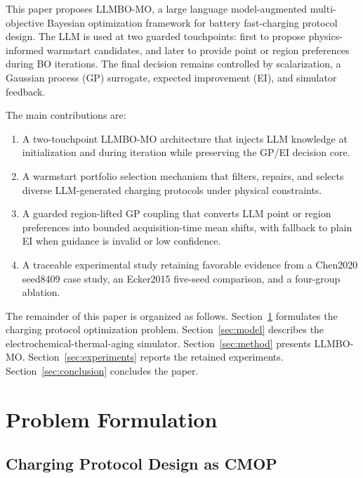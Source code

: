 \documentclass[journal]{IEEEtran}
\begin{document}
This paper proposes LLMBO-MO, a large language model-augmented multi-objective
Bayesian optimization framework for battery fast-charging protocol design. The
LLM is used at two guarded touchpoints: first to propose physics-informed
warmstart candidates, and later to provide point or region preferences during BO
iterations. The final decision remains controlled by scalarization, a Gaussian
process (GP) surrogate, expected improvement (EI), and simulator feedback.

The main contributions are:
\begin{enumerate}
\item A two-touchpoint LLMBO-MO architecture that injects LLM knowledge at
initialization and during iteration while preserving the GP/EI decision core.
\item A warmstart portfolio selection mechanism that filters, repairs, and
selects diverse LLM-generated charging protocols under physical constraints.
\item A guarded region-lifted GP coupling that converts LLM point or region
preferences into bounded acquisition-time mean shifts, with fallback to plain EI
when guidance is invalid or low confidence.
\item A traceable experimental study retaining favorable evidence from a
Chen2020 seed8409 case study, an Ecker2015 five-seed comparison, and a
four-group ablation.
\end{enumerate}

The remainder of this paper is organized as follows. Section~\ref{sec:problem}
formulates the charging protocol optimization problem. Section~\ref{sec:model}
describes the electrochemical-thermal-aging simulator. Section~\ref{sec:method}
presents LLMBO-MO. Section~\ref{sec:experiments} reports the retained
experiments. Section~\ref{sec:conclusion} concludes the paper.

\section{Problem Formulation}
\label{sec:problem}

\subsection{Charging Protocol Design as CMOP}
\end{document}
